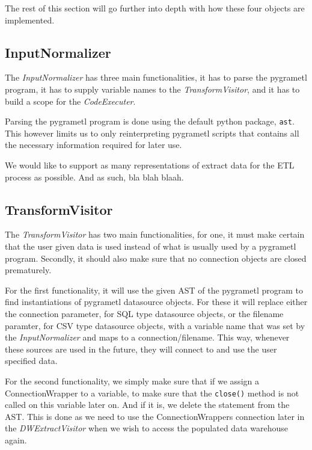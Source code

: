 The rest of this section will go further into depth with how these four objects are implemented.

\subsection{InputNormalizer}
The \textit{InputNormalizer} has three main functionalities, it has to parse the pygrametl program, it has to supply variable names to the \textit{TransformVisitor}, and it has to build a scope for the \textit{CodeExecuter}.

Parsing the pygrametl program is done using the default python package, \texttt{ast}. This however limits us to only reinterpreting pygrametl scripts that contains all the necessary information required for later use.

We would like to support as many representations of extract data for the ETL process as possible. And as such, bla blah blaah. 


\subsection{TransformVisitor}
The \textit{TransformVisitor} has two main functionalities, for one, it must make certain that the user  given data is used instead of what is usually used by a pygrametl program. Secondly, it should also make sure that no connection objects are closed prematurely. 

For the first functionality, it will use the given AST of the pygrametl program to find instantiations of pygrametl datasource objects. For these it will replace either the connection parameter, for SQL type datasource objects, or the filename paramter, for CSV type datasource objects, with a variable name that was set by the \textit{InputNormalizer} and maps to a connection/filename. This way, whenever these sources are used in the future, they will connect to and use the user specified data.

For the second functionality, we simply make sure that if we assign a ConnectionWrapper to a variable, to make sure that the \texttt{close()} method is not called on this variable later on. And if it is, we delete the statement from the AST. This is done as we need to use the ConnectionWrappers connection later in the \textit{DWExtractVisitor} when we wish to access the populated data warehouse again.

